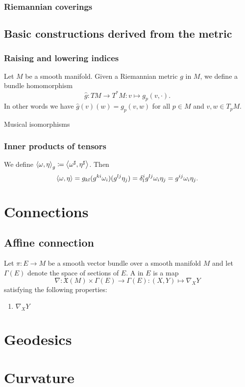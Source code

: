 \subsubsection{Riemannian coverings}

\subsection{Basic constructions derived from the metric}
\subsubsection{Raising and lowering indices}
Let $M$ be a smooth manifold. Given a Riemannian metric $g$ in $M$, we define a bundle homomorphism
\[ \hat{g}: TM \to T^*M: v\mapsto g_p(v,\cdot). \]
In other words we have $\hat{g}(v)(w) = g_p(v,w)$ for all $p\in M$ and $v,w\in T_pM$.

Musical isomorphisms

\subsubsection{Inner products of tensors}
We define $\left\langle \omega, \eta \right\rangle_g \coloneqq \left\langle \omega^\sharp, \eta^\sharp \right\rangle$.
Then
\[ \left\langle \omega,\eta \right\rangle= g_{kl}(g^{ki}\omega_i)(g^{lj}\eta_j) = \delta^i_lg^{lj}\omega_i\eta_j = g^{ij}\omega_i\eta_j. \]



\section{Connections}
\subsection{Affine connection}
\begin{definition}
Let $\pi: E\to M$ be a smooth vector bundle over a smooth manifold $M$ and let $\Gamma(E)$ denote the space of sections of $E$. A  in $E$ is a map
\[ \nabla: \mathfrak{X}(M)\times \Gamma(E) \to \Gamma(E): (X,Y)\mapsto \nabla_X Y \]
satisfying the following properties:
\begin{enumerate}
\item $\nabla_X Y$
\end{enumerate}
\end{definition}

\section{Geodesics}


\section{Curvature}